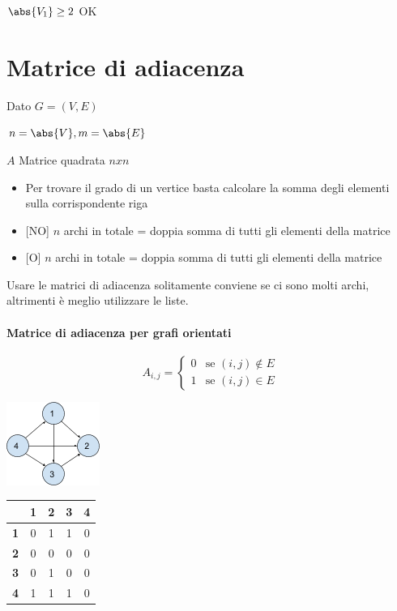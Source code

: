 {$\abs{V_1} \geq 2$ OK}

\section{Matrice di adiacenza}

{Dato $G=(V,E)$}

$n=\abs{V},m=\abs{E}$

{$A$ Matrice quadrata $n x n$ }

\begin{itemize}
\tightlist
\item
  {Per trovare il grado di un vertice basta calcolare la somma degli elementi sulla corrispondente riga}
\item
  {{[}NO{]} $n$ archi in totale = doppia somma di tutti gli elementi della matrice}
\item
  {{[}O{]} $n$ archi in totale = doppia somma di tutti gli elementi della matrice}
\end{itemize}

{Usare le matrici di adiacenza solitamente conviene se ci sono molti archi, altrimenti è meglio utilizzare le liste.}

\paragraph{Matrice di adiacenza per grafi orientati}

\begin{equation}
A_{i,j} = 
\begin{cases}
0 & \mbox{se } (i,j) \notin E \\ 
1 & \mbox{se } (i,j) \in E
\end{cases}
\end{equation}

{\includegraphics{images/image529.png}}

\begin{tabular}{|c|c|c|c|c|}
\hline 
  & \textbf{1} & \textbf{2} & \textbf{3} & \textbf{4} \\ 
\hline 
\textbf{1} & 0 & 1 & 1 & 0 \\ 
\hline 
\textbf{2} & 0 & 0 & 0 & 0 \\ 
\hline 
\textbf{3} & 0 & 1 & 0 & 0 \\ 
\hline 
\textbf{4} & 1 & 1 & 1 & 0 \\ 
\hline 
\end{tabular} 

